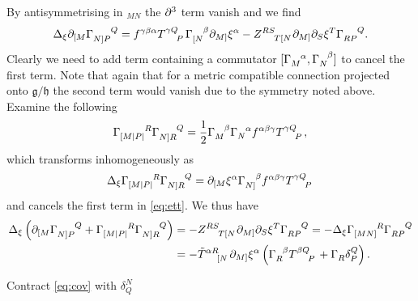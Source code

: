 \documentclass{article}
\begin{document}
By antisymmetrising in $_{MN}$ the $\partial^3$ term vanish and we find 
\begin{equation}\label{eq:ett}
    \Delta_\xi \pd_{[M}\tensor{\Gamma}{_{N]P}^Q} = f^{\gamma\beta\alpha}\tensor{T}{^{\gamma Q}_P}\tensor{\Gamma}{_{[N}^\beta}\pd_{M]}\xi^\alpha-\tensor{Z}{^{RS}_{T[N}}\pd_{M]}\pd_S\xi^T\tensor{\Gamma}{_{RP}^Q}.
\end{equation}
Clearly we need to add term containing a commutator $[\tensor{\Gamma}{_M^\alpha},\tensor{\Gamma}{_{N}^\beta}]$ to cancel the first term. Note that again that for a metric compatible connection projected onto $\mathfrak{g}/\mathfrak{h}$ the second term would vanish due to the symmetry noted above. Examine the following
\begin{align*}
    \tensor{\Gamma}{_{[M|P|}^R}\tensor{\Gamma}{_{N]R}^Q} = \frac{1}{2}\tensor{\Gamma}{_{M}^\beta}\tensor{\Gamma}{_{N}^\alpha}f^{\alpha\beta\gamma}\tensor{T}{^\gamma ^Q_P},
\end{align*}
which transforms inhomogeneously as 
\begin{equation}
    \Delta_\xi \tensor{\Gamma}{_{[M|P|}^R}\tensor{\Gamma}{_{N]R}^Q} = \pd_{[M}\xi^\alpha \tensor{\Gamma}{_{N]}^\beta}f^{\alpha\beta\gamma}\tensor{T}{^\gamma ^Q_P}
\end{equation}
and cancels the first term in \eqref{eq:ett}. We thus have 
\begin{align*}\label{eq:cov}
    \Delta_\xi\left(\pd_{[M}\tensor{\Gamma}{_{N]P}^Q}+\tensor{\Gamma}{_{[M|P|}^R}\tensor{\Gamma}{_{N]R}^Q}\right)&= -\tensor{Z}{^{RS}_{T[N}}\pd_{M]}\pd_S\xi^T\tensor{\Gamma}{_{RP}^Q} = -\Delta_\xi \tensor{\Gamma}{_{[MN]}^R}\tensor{\Gamma}{_{RP}^Q}\\
    &= -\tensor{\tilde{T}}{^{\alpha R}_{[N}}\pd_{M]}\xi^\alpha \left(\tensor{\Gamma}{_R^\beta}\tensor{T}{^{\beta Q}_P}+\tensor{\Gamma}{_R}\delta^Q_P\right).
\end{align*}

Contract \ref{eq:cov} with $\delta_Q^N$
\end{document}
